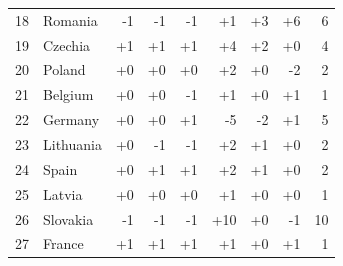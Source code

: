 \begin{landscape}
\begin{longtable}{@{}rl rrrrrr r@{}}
  18 & Romania & -1 & -1 & -1 & +1 & +3 & +6 & 6 \\
  19 & Czechia & +1 & +1 & +1 & +4 & +2 & +0 & 4 \\
  20 & Poland & +0 & +0 & +0 & +2 & +0 & -2 & 2 \\
  21 & Belgium & +0 & +0 & -1 & +1 & +0 & +1 & 1 \\
  22 & Germany & +0 & +0 & +1 & -5 & -2 & +1 & 5 \\
  23 & Lithuania & +0 & -1 & -1 & +2 & +1 & +0 & 2 \\
  24 & Spain & +0 & +1 & +1 & +2 & +1 & +0 & 2 \\
  25 & Latvia & +0 & +0 & +0 & +1 & +0 & +0 & 1 \\
  26 & Slovakia & -1 & -1 & -1 & +10 & +0 & -1 & 10 \\
  27 & France & +1 & +1 & +1 & +1 & +0 & +1 & 1 \\
\end{longtable}
\end{landscape}